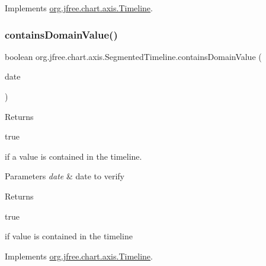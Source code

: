 Implements \mbox{\hyperlink{interfaceorg_1_1jfree_1_1chart_1_1axis_1_1_timeline_a2c56414de5571774ff54ad8c10702a87}{org.\+jfree.\+chart.\+axis.\+Timeline}}.

\mbox{\label{classorg_1_1jfree_1_1chart_1_1axis_1_1_segmented_timeline_a36df47cbf970d1268f96686da04bc199}} 
\subsubsection{\texorpdfstring{contains\+Domain\+Value()}{containsDomainValue()}\hspace{0.1cm}{\footnotesize\ttfamily [2/2]}}
{\footnotesize\ttfamily boolean org.\+jfree.\+chart.\+axis.\+Segmented\+Timeline.\+contains\+Domain\+Value (\begin{DoxyParamCaption}\item[{Date}]{date }\end{DoxyParamCaption})}

Returns
\begin{DoxyCode}
\textcolor{keyword}{true} 
\end{DoxyCode}
 if a value is contained in the timeline.


\begin{DoxyParams}{Parameters}
{\em date} & date to verify\\
\hline
\end{DoxyParams}
\begin{DoxyReturn}{Returns}

\begin{DoxyCode}
\textcolor{keyword}{true} 
\end{DoxyCode}
 if value is contained in the timeline 
\end{DoxyReturn}


Implements \mbox{\hyperlink{interfaceorg_1_1jfree_1_1chart_1_1axis_1_1_timeline_a256e6d8899290d1f8a31f9d0c5ec69e7}{org.\+jfree.\+chart.\+axis.\+Timeline}}.

\mbox{\label{classorg_1_1jfree_1_1chart_1_1axis_1_1_segmented_timeline_aa7bbe6193eefeabcdd77eb523951b5fb}} 
